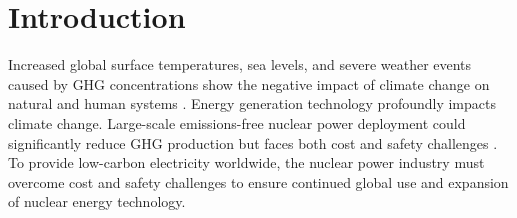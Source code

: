 \chapter{Introduction}
\label{sec:intro}
Increased global surface temperatures, sea levels, and severe weather events 
caused by \gls{GHG} concentrations show the negative impact of 
climate change on natural and human systems \cite{noauthor_climate_2018}.  
Energy generation technology profoundly impacts climate change. 
Large-scale emissions-free nuclear power deployment could significantly reduce 
\gls{GHG} production but faces both cost and safety challenges 
\cite{noauthor_climate_2018}. 
To provide low-carbon electricity worldwide, the nuclear power industry must 
overcome cost and safety challenges to ensure continued global use and 
expansion of nuclear energy technology.